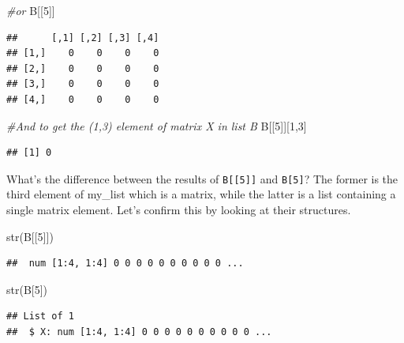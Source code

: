 \documentclass[
]{book}
\newenvironment{Shaded}{\begin{snugshade}}{\end{snugshade}}
\newcommand{\CommentTok}[1]{\textcolor[rgb]{0.56,0.35,0.01}{\textit{#1}}}
\newcommand{\DecValTok}[1]{\textcolor[rgb]{0.00,0.00,0.81}{#1}}
\newcommand{\FunctionTok}[1]{\textcolor[rgb]{0.00,0.00,0.00}{#1}}
\newcommand{\NormalTok}[1]{#1}
\theoremstyle{definition}
\theoremstyle{definition}
\theoremstyle{definition}
\theoremstyle{definition}
\theoremstyle{remark}
\begin{document}
\begin{Shaded}
\begin{Highlighting}[]
\CommentTok{\#or}
\NormalTok{B[[}\DecValTok{5}\NormalTok{]]}
\end{Highlighting}
\end{Shaded}

\begin{verbatim}
##      [,1] [,2] [,3] [,4]
## [1,]    0    0    0    0
## [2,]    0    0    0    0
## [3,]    0    0    0    0
## [4,]    0    0    0    0
\end{verbatim}

\begin{Shaded}
\begin{Highlighting}[]
\CommentTok{\#And to get the (1,3) element of matrix X in list B}
\NormalTok{B[[}\DecValTok{5}\NormalTok{]][}\DecValTok{1}\NormalTok{,}\DecValTok{3}\NormalTok{]}
\end{Highlighting}
\end{Shaded}

\begin{verbatim}
## [1] 0
\end{verbatim}

What's the difference between the results of \texttt{B{[}{[}5{]}{]}} and \texttt{B{[}5{]}}? The former is the third element of my\_list which is a matrix, while the latter is a list containing a single matrix element. Let's confirm this by looking at their structures.

\begin{Shaded}
\begin{Highlighting}[]
\FunctionTok{str}\NormalTok{(B[[}\DecValTok{5}\NormalTok{]])}
\end{Highlighting}
\end{Shaded}

\begin{verbatim}
##  num [1:4, 1:4] 0 0 0 0 0 0 0 0 0 0 ...
\end{verbatim}

\begin{Shaded}
\begin{Highlighting}[]
\FunctionTok{str}\NormalTok{(B[}\DecValTok{5}\NormalTok{])}
\end{Highlighting}
\end{Shaded}

\begin{verbatim}
## List of 1
##  $ X: num [1:4, 1:4] 0 0 0 0 0 0 0 0 0 0 ...
\end{verbatim}
\end{document}
